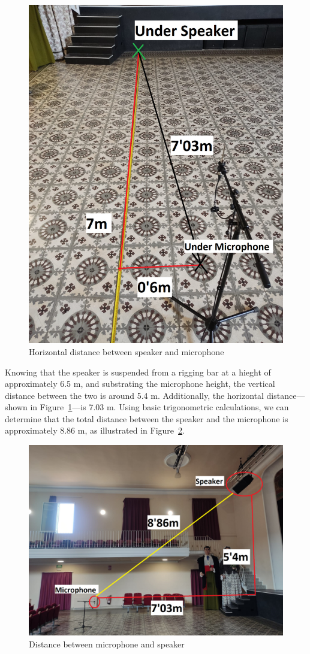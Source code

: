 \begin{figure}[H]
	\centering
	\includegraphics[width=0.6
	\linewidth]{Figures/Coro_floor_trigo.jpeg}
	\caption{Horizontal distance between speaker and microphone}
	\label{fig:Floor_section}
\end{figure}

Knowing that the speaker is suspended from a rigging bar at a hieght of approximately 6.5 m, and substrating the microphone height, the vertical distance between the two is around 5.4 m. Additionally, the horizontal distance—shown in Figure~\ref{fig:Floor_section}—is 7.03 m. Using basic trigonometric calculations, we can determine that the total distance between the speaker and the microphone is approximately 8.86 m, as illustrated in Figure~\ref{fig:spk-mic}.


\begin{figure}[H]
	\centering
	\includegraphics[width=1
	\linewidth]{Figures/Coro_section_trigo.jpeg}
	\caption{Distance between microphone and speaker}
	\label{fig:spk-mic}
\end{figure}


